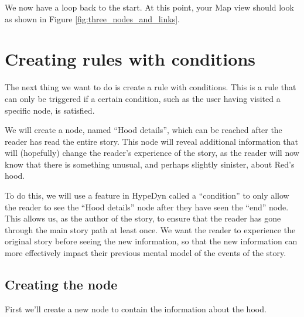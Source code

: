 \documentclass{article}
\begin{document}
We now have a loop back to the start. At this point, your Map view should look
as shown in Figure \ref{fig:three_nodes_and_links}.

\section{Creating rules with conditions}

The next thing we want to do is create a rule with conditions. This is a rule
that can only be triggered if a certain condition, such as the user having
visited a specific node, is satisfied.

We will create a node, named ``Hood details'', which can be reached after the
reader has read the entire story. This node will reveal additional information
that will (hopefully) change the reader's experience of the story, as the reader
will now know that there is something unusual, and perhaps slightly sinister,
about Red's hood.

To do this, we will use a feature in HypeDyn called a ``condition'' to only allow
the reader to see the ``Hood details'' node after they have seen the ``end''
node. This allows us, as the author of the story, to ensure that the reader has
gone through the main story path at least once. We want the reader to experience
the original story before seeing the new information, so that the new information
can more effectively impact their previous mental model of the events of the
story.

\subsection{Creating the node}

First we'll create a new node to contain the information about the hood.
\end{document}
